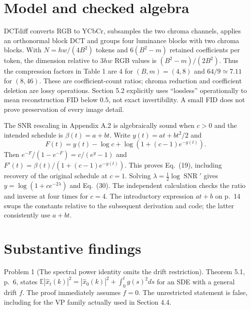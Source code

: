 \documentclass[10pt]{article}
\begin{document}
\section*{Model and checked algebra}
DCTdiff converts RGB to YCbCr, subsamples the two chroma channels, applies an orthonormal block DCT and groups four luminance blocks with two chroma blocks. With \(N=hw/(4B^2)\) tokens and \(6(B^2-m)\) retained coefficients per token, the dimension relative to \(3hw\) RGB values is \((B^2-m)/(2B^2)\). Thus the compression factors in Table 1 are \(4\) for \((B,m)=(4,8)\) and \(64/9\simeq7.11\) for \((8,46)\). These are coefficient-count ratios; chroma reduction and coefficient deletion are lossy operations. Section 5.2 explicitly uses “lossless” operationally to mean reconstruction FID below \(0.5\), not exact invertibility. A small FID does not prove preservation of every image detail.\par
The SNR rescaling in Appendix A.2 is algebraically sound when \(c>0\) and the intended schedule is \(\beta(t)=a+bt\). Write \(y(t)=at+bt^2/2\) and \[F(t)=y(t)-\log c+\log(1+(c-1)e^{-y(t)}).\] Then \(e^{-F}/(1-e^{-F})=c/(e^y-1)\) and \(F'(t)=\beta(t)/(1+(c-1)e^{-y(t)})\). This proves Eq. (19), including recovery of the original schedule at \(c=1\). Solving \(\lambda=\frac12\log\operatorname{SNR}'\) gives \(y=\log(1+ce^{-2\lambda})\) and Eq. (30). The independent calculation checks the ratio and inverse at four times for \(c=4\). The introductory expression \(at+b\) on p. 14 swaps the constants relative to the subsequent derivation and code; the latter consistently use \(a+bt\).\par
\section*{Substantive findings}
Problem 1 (The spectral power identity omits the drift restriction).  Theorem 5.1, p. 6, states \(\mathbb E|\widehat x_t(k)|^2=|\widehat x_0(k)|^2+\int_0^t g(s)^2ds\) for an SDE with a general drift \(f\). The proof immediately assumes \(f=0\). The unrestricted statement is false, including for the VP family actually used in Section 4.4.\par
\end{document}
